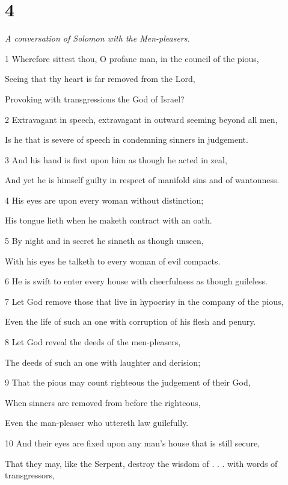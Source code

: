 \chapter{4}

\par \textit{A conversation of Solomon with the Men-pleasers.}

\par 1 Wherefore sittest thou, O profane man, in the council of the pious,
\par  Seeing that thy heart is far removed from the Lord,
\par  Provoking with transgressions the God of Israel?
\par 2 Extravagant in speech, extravagant in outward seeming beyond all men,
\par  Is he that is severe of speech in condemning sinners in judgement.
\par 3 And his hand is first upon him as though he acted in zeal,
\par  And yet he is himself guilty in respect of manifold sins and of wantonness.
\par 4 His eyes are upon every woman without distinction;
\par  His tongue lieth when he maketh contract with an oath.
\par 5 By night and in secret he sinneth as though unseen,
\par  With his eyes he talketh to every woman of evil compacts.
\par 6 He is swift to enter every house with cheerfulness as though guileless.
\par    
\par 7 Let God remove those that live in hypocrisy in the company of the pious,
\par  Even the life of such an one with corruption of his flesh and penury.
\par 8 Let God reveal the deeds of the men-pleasers,
\par  The deeds of such an one with laughter and derision;
\par 9 That the pious may count righteous the judgement of their God,
\par  When sinners are removed from before the righteous,
\par  Even the man-pleaser who uttereth law guilefully.
\par 10 And their eyes are fixed upon any man's house that is still secure,
\par  That they may, like the Serpent, destroy the wisdom of . . . with words of transgressors,
